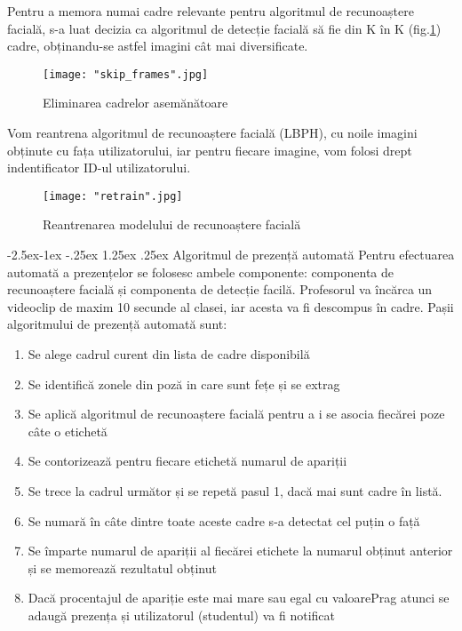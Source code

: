 \documentclass[a4paper, 12pt]{article}
\makeatletter
\renewcommand\paragraph{\@startsection{paragraph}{4}{\z@}%
	{-2.5ex\@plus -1ex \@minus -.25ex}%
	{1.25ex \@plus .25ex}%
	{\normalfont\normalsize\bfseries}}
\makeatother
\begin{document}
	Pentru a memora numai cadre relevante pentru algoritmul de recunoaștere facială, s-a luat decizia ca algoritmul de detecție facială să fie din K în K (fig.\ref{fig::skip_frames}) cadre, obținandu-se astfel imagini cât mai diversificate.
	
	\begin{figure}[H]
		\centering
		\texttt{[image: "skip\_frames".jpg]}
		\caption{Eliminarea cadrelor asemănătoare}\label{fig::skip_frames}
	\end{figure} 
	
	Vom reantrena algoritmul de recunoaștere facială (LBPH), cu noile imagini obținute cu fața utilizatorului, iar pentru fiecare imagine, vom folosi drept indentificator ID-ul utilizatorului.
	
	\begin{figure}[H]
		\centering
		\texttt{[image: "retrain".jpg]}
		\caption{Reantrenarea modelului de recunoaștere facială}\label{fig::retrain}
	\end{figure} 
	
	\bigskip
	\paragraph{Algoritmul de prezență automată}
	\quad Pentru efectuarea automată a prezențelor se folosesc ambele componente: componenta de recunoaștere facială și componenta de detecție facilă. Profesorul va încărca un videoclip de maxim 10 secunde al clasei, iar acesta va fi descompus în cadre. Pașii algoritmului de prezență automată sunt:
	
	\begin{enumerate}
		\item Se alege cadrul curent din lista de cadre disponibilă
		\item Se identifică zonele din poză in care sunt fețe și se extrag
		\item Se aplică algoritmul de recunoaștere facială pentru a i se asocia fiecărei poze câte o etichetă
		\item Se contorizează pentru fiecare etichetă numarul de apariții
		\item Se trece la cadrul următor și se repetă pasul 1, dacă mai sunt cadre în listă.
		\item Se numară în câte dintre toate aceste cadre s-a detectat cel puțin o față
		\item Se împarte numarul de apariții al fiecărei etichete la numarul obținut anterior și se memorează rezultatul obținut
		\item Dacă procentajul de apariție este mai mare sau egal cu valoarePrag atunci se adaugă prezența și utilizatorul (studentul) va fi notificat 
	\end{enumerate}
	
\end{document}
